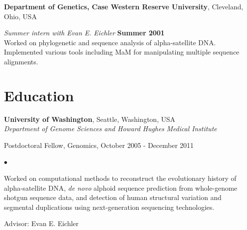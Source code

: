 \documentclass[margin,line]{res}
\newenvironment{list1}{
  \begin{list}{\ding{113}}{%
      \setlength{\itemsep}{0in}
      \setlength{\parsep}{0in} \setlength{\parskip}{0in}
      \setlength{\topsep}{0in} \setlength{\partopsep}{0in} 
      \setlength{\leftmargin}{0.17in}}}{\end{list}}
\newenvironment{list2}{
  \begin{list}{$\bullet$}{%
      \setlength{\itemsep}{0.1cm}
      \setlength{\parsep}{0in} \setlength{\parskip}{0in}
      \setlength{\topsep}{0in} \setlength{\partopsep}{0in} 
      \setlength{\leftmargin}{0.2in}}}{\end{list}}
\begin{document}
\begin{resume}
{                                                {\bf Department of Genetics, Case Western Reserve University},
                                                Cleveland, Ohio, USA
                                                
                                                \vspace{-.2cm}
                                                       {\em Summer intern with Evan E. Eichler} \hfill {\bf Summer 2001}\\
                                                       Worked on phylogenetic and sequence analysis of alpha-satellite
                                                       DNA. Implemented various tools including MaM for manipulating multiple
                                                       sequence alignments.
                                       }
                                       
  \section{\sc Education}
          {\bf University of Washington}, Seattle, Washington, USA\\
          {\em Department of Genome Sciences and Howard Hughes Medical Institute} \\
          \vspace*{-.1in}
          \begin{list1}
          \item[] Postdoctoral Fellow, Genomics, October 2005 - December 2011
            \begin{list2}
              \vspace*{.05in}
            \item
              Worked on computational methods to reconstruct
              the evolutionary history of alpha-satellite DNA, {\it de novo} alphoid sequence prediction
              from whole-genome shotgun sequence data, and detection of human structural variation and segmental duplications using next-generation
              sequencing technologies.
            \item Advisor: Evan E. Eichler
            \end{list2}
          \end{list1}
          

\end{resume}
\end{document}
